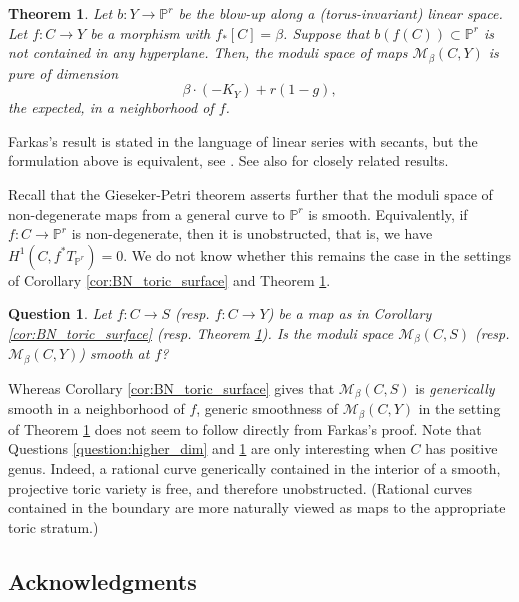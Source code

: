 \documentclass[12pt]{amsart}
\def\cM{{\mathcal{M}}}
\def\P{\mathbb{P}}
\def\bP{\mathbb{P}}
\newtheorem{theorem}[definition]{Theorem}
\newtheorem{question}[definition]{Question}
\begin{document}
\begin{theorem}\cite[Theorem 0.1]{farkas}\label{thm:farkas}
    Let $b:Y\to \P^r$ be the blow-up along a (torus-invariant) linear space. Let $f:C\to Y$ be a morphism with $f_{*}[C]=\beta$. Suppose that $b(f(C))\subset\bP^r$ is not contained in any hyperplane. Then, the moduli space of maps $\cM_\beta(C,Y)$ is pure of dimension
    \begin{equation*}
        \beta\cdot(-K_Y)+r(1-g),
    \end{equation*}
    the expected, in a neighborhood of $f$.
\end{theorem}

 Farkas's result is stated in the language of linear series with secants, but the formulation above is equivalent, see \cite[Corollary 2.3.4]{cl_complete}. See also \cite{cotterill, ungureanu, farkas2} for closely related results.

 Recall that the Gieseker-Petri theorem asserts further that the moduli space of non-degenerate maps from a general curve to $\mathbb{P}^r$ is smooth. Equivalently, if $f:C\to\bP^r$ is non-degenerate, then it is unobstructed, that is, we have $H^1(C,f^{*}T_{\bP^r})=0$. We do not know whether this remains the case in the settings of Corollary \ref{cor:BN_toric_surface} and Theorem \ref{thm:farkas}.

 \begin{question}\label{question:smoothness}
     Let $f:C\to S$ (resp. $f:C\to Y$) be a map as in Corollary \ref{cor:BN_toric_surface} (resp. Theorem \ref{thm:farkas}). Is the moduli space $\cM_\beta(C,S)$ (resp. $\cM_\beta(C,Y)$) smooth at $f$?
 \end{question}

 Whereas Corollary \ref{cor:BN_toric_surface} gives that $\cM_\beta(C,S)$ is \emph{generically} smooth in a neighborhood of $f$, generic smoothness of $\cM_\beta(C,Y)$ in the setting of Theorem \ref{thm:farkas} does not seem to follow directly from Farkas's proof. Note that Questions \ref{question:higher_dim} and \ref{question:smoothness} are only interesting when $C$ has positive genus. Indeed, a rational curve generically contained in the interior of a smooth, projective toric variety is free, and therefore unobstructed. (Rational curves contained in the boundary are more naturally viewed as maps to the appropriate toric stratum.)

\subsection{Acknowledgments}
\end{document}

